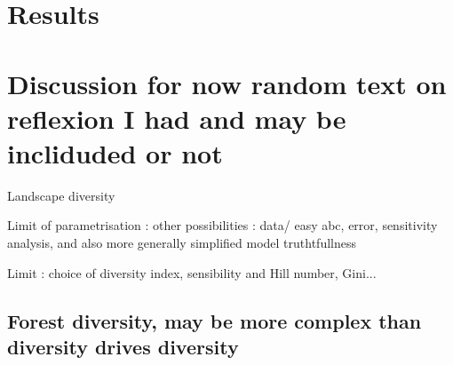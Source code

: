 \documentclass{article}
\begin{document}
\section{Results}

\section{Discussion for now random text on reflexion I had and may be incliduded or not}

Landscape diversity

Limit of parametrisation : other possibilities : data/ easy abc, error, sensitivity analysis, and also more generally simplified model truthtfullness

Limit : choice of diversity index, sensibility and Hill number, Gini...

\subsection{Forest diversity, may be more complex than diversity drives diversity}
\end{document}
